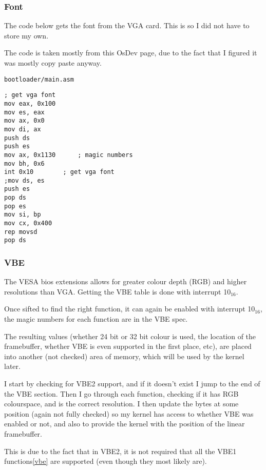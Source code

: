 \documentclass{article}
\begin{document}
\subsubsection{Font}

The code below gets the font from the VGA card. This
is so I did not have to store my own.

The code is taken mostly from this OsDev page\cite{get vga font},
due to the fact that I figured it was mostly copy paste anyway.

\begin{verbatim}
bootloader/main.asm
\end{verbatim}
\begin{verbatim}
; get vga font
mov eax, 0x100
mov es, eax
mov ax, 0x0
mov di, ax
push ds
push es
mov ax, 0x1130		; magic numbers
mov bh, 0x6
int 0x10		; get vga font
;mov ds, es
push es
pop ds
pop es
mov si, bp
mov cx, 0x400
rep movsd
pop ds
\end{verbatim}

\subsubsection{VBE}

The VESA bios extensions allows for greater colour depth (RGB) and higher
resolutions than VGA. Getting the VBE table is done with interrupt 10$_{16}$\cite{vbe}.

Once sifted to find the right function, it can again be enabled with
interrupt 10$_{16}$, the magic numbers for each function are in the
VBE spec\cite{vbe}.

The resulting values (whether 24 bit or 32 bit colour is used, the location of
the framebuffer, whether VBE is even supported in the first place, etc), are placed
into another (not checked) area of memory, which will be used by the kernel later.

I start by checking for VBE2 support, and if it doesn't exist I jump to the end of
the VBE section.
Then I go through each function, checking if it has RGB colourspace, and is the
correct resolution.
I then update the bytes at some position (again not fully checked) so my kernel has access
to whether VBE was enabled or not, and also to provide the kernel with
the position of the linear framebuffer.

This is due to the fact that in VBE2, it is not required that all the VBE1 functions\ref{vbe}
are supported (even though they most likely are).
\end{document}
